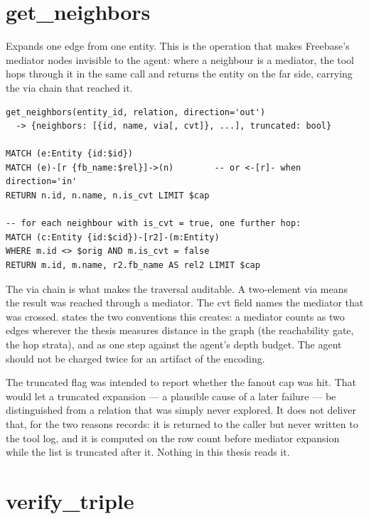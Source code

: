 \section{get\_neighbors}\label{app:tool-neighbors}

Expands one edge from one entity. This is the operation that makes Freebase's
mediator nodes invisible to the agent: where a neighbour is a mediator, the tool
hops through it in the same call and returns the entity on the far side,
carrying the \textsf{via} chain that reached it.

\begin{lstlisting}[style=verbatimblock]
get_neighbors(entity_id, relation, direction='out')
  -> {neighbors: [{id, name, via[, cvt]}, ...], truncated: bool}

MATCH (e:Entity {id:$id})
MATCH (e)-[r {fb_name:$rel}]->(n)        -- or <-[r]- when direction='in'
RETURN n.id, n.name, n.is_cvt LIMIT $cap

-- for each neighbour with is_cvt = true, one further hop:
MATCH (c:Entity {id:$cid})-[r2]-(m:Entity)
WHERE m.id <> $orig AND m.is_cvt = false
RETURN m.id, m.name, r2.fb_name AS rel2 LIMIT $cap
\end{lstlisting}

The \textsf{via} chain is what makes the traversal auditable. A two-element
\textsf{via} means the result was reached through a mediator. The
\textsf{cvt} field names the mediator that was crossed.
 states the two conventions this creates: a
mediator counts as two edges wherever the thesis measures distance in the graph
(the reachability gate, the hop strata), and as one step against the agent's
depth budget. The agent should not be charged twice for an artifact of
the encoding.

The \textsf{truncated} flag was intended to report whether the fanout cap was
hit. That would let a truncated expansion --- a plausible cause of a later
failure --- be distinguished from a relation that was simply never explored. It
does not deliver that, for the two reasons  records: it is
returned to the caller but never written to the tool log, and it is computed on
the row count before mediator expansion while the list is truncated after it.
Nothing in this thesis reads it.

\section{verify\_triple}\label{app:tool-verify-triple}


